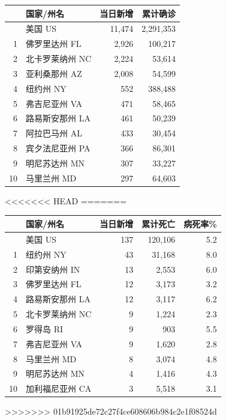 \documentclass[]{article}
\begin{document}
\begin{table}[H]
\begin{minipage}{.7\linewidth}
\begin{table}[H]
\begin{tabular}{rlrr}
\toprule
  & 国家/州名 & 当日新增 & 累计确诊\\
\midrule
\rowcolor{gray!6}   & 美国 US & 11,474 & 2,291,353\\
1 & 佛罗里达州 FL & 2,926 & 100,217\\
\rowcolor{gray!6}  2 & 北卡罗莱纳州 NC & 2,224 & 53,614\\
3 & 亚利桑那州 AZ & 2,008 & 54,599\\
\rowcolor{gray!6}  4 & 纽约州 NY & 552 & 388,488\\
5 & 弗吉尼亚州 VA & 471 & 58,465\\
\rowcolor{gray!6}  6 & 路易斯安那州 LA & 461 & 50,239\\
7 & 阿拉巴马州 AL & 433 & 30,454\\
\rowcolor{gray!6}  8 & 宾夕法尼亚州 PA & 366 & 86,301\\
9 & 明尼苏达州 MN & 307 & 33,227\\
\rowcolor{gray!6}  10 & 马里兰州 MD & 297 & 64,603\\
\bottomrule
\end{tabular}
<<<<<<< HEAD
=======
\end{table} \end{minipage}%
    \begin{minipage}{.7\linewidth}
     \caption{美国新增死亡前十位州}
     \vspace{0.5\baselineskip}
      \centering
    \captionsetup{justification=centering} \begin{table}[H]
\centering
\begin{tabular}{rlrrr}
\toprule
  & 国家/州名 & 当日新增 & 累计死亡 & 病死率\%\\
\midrule
\rowcolor{gray!6}   & 美国 US & 137 & 120,106 & 5.2\\
1 & 纽约州 NY & 43 & 31,168 & 8.0\\
\rowcolor{gray!6}  2 & 印第安纳州 IN & 13 & 2,553 & 6.0\\
3 & 佛罗里达州 FL & 12 & 3,173 & 3.2\\
\rowcolor{gray!6}  4 & 路易斯安那州 LA & 12 & 3,117 & 6.2\\
5 & 北卡罗莱纳州 NC & 9 & 1,224 & 2.3\\
\rowcolor{gray!6}  6 & 罗得岛 RI & 9 & 903 & 5.5\\
7 & 弗吉尼亚州 VA & 9 & 1,620 & 2.8\\
\rowcolor{gray!6}  8 & 马里兰州 MD & 8 & 3,074 & 4.8\\
9 & 明尼苏达州 MN & 4 & 1,416 & 4.3\\
\rowcolor{gray!6}  10 & 加利福尼亚州 CA & 3 & 5,518 & 3.1\\
\bottomrule
\end{tabular}
>>>>>>> 01b91925de72c27f4ce608606b984c2e1f08524d
\end{table} \end{minipage} 
\end{table}
\end{document}
